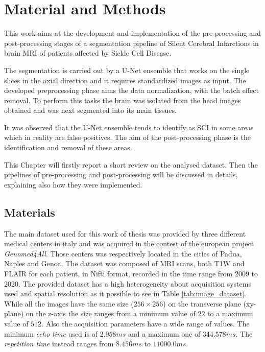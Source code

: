 \documentclass{standalone}
\begin{document}
\chapter{Material and Methods}\label{CAP:Methods}

This work aims at the development and implementation of the pre-processing and post-processing stages of a segmentation pipeline of Silent Cerebral Infarctions in brain MRI of patients affected by Sickle Cell Disease. 

The segmentation is carried out by a U-Net ensemble \cite{ART:Biondini} that works on the single slices in the axial direction and it requires standardized images as input. The developed preprocessing phase aims the data normalization, with the batch effect removal. To perform this tasks the brain was isolated from the head images obtained and was next segmented into its main tissues. 

It was observed that the U-Net ensemble tends to identify as SCI in some areas which in reality are false positives. The aim of the post-processing phase is the identification and removal of these areas. 

This Chapter will firstly report a short review on the analysed dataset. Then the pipelines of pre-processing and post-processing will be discussed in details, explaining also how they were implemented.


\section{Materials} \label{chap:materials}

The main dataset used for this work of thesis was provided by three different medical centers in italy and was acquired in the contest of the european project \emph{Genomed4All}. Those centers was respectively located in the cities of Padua, Naples and Genoa.
The dataset was composed of MRI scans, both T1W and FLAIR for each patient, in Nifti format, recorded in the time range from 2009 to 2020.
The provided dataset has a high heterogeneity about acquisition systems used and spatial resolution as it possible to see in Table \ref{tab:image_dataset}. 
While all the images have the same size ($256 \times 256$) on the transverse plane (xy-plane) on the z-axis the size ranges from a minimum value of $22$ to a maximum value of $512$.
Also the acquisition parameters have a wide range of values. The minimum \emph{echo time} used is of $2.958 ms$ and a maximum one of $344.578ms$. The \emph{repetition time} instead ranges from $8.456ms$ to $11000.0ms$. 
\end{document}
